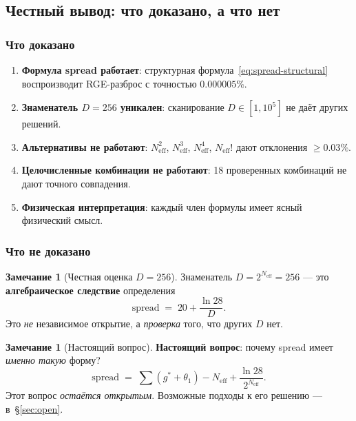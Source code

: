 \documentclass[11pt,a4paper]{article}
\theoremstyle{definition}
\newtheorem{remark}[theorem]{Замечание}
\begin{document}
\subsection{Честный вывод: что доказано, а что нет}
\label{subsec:spread-honest}

\subsubsection{Что доказано}

\begin{enumerate}
    \item \textbf{Формула spread работает}: структурная
          формула~\eqref{eq:spread-structural} воспроизводит
          RGE-разброс с точностью $\mathbf{0.000005\%}$.
    \item \textbf{Знаменатель $D = 256$ уникален}: сканирование
          $D \in [1, 10^5]$ не даёт других решений.
    \item \textbf{Альтернативы не работают}: $N_{\text{eff}}^2$,
          $N_{\text{eff}}^3$, $N_{\text{eff}}^4$, $N_{\text{eff}}!$
          дают отклонения $\geq 0.03\%$.
    \item \textbf{Целочисленные комбинации не работают}: 18 проверенных
          комбинаций не дают точного совпадения.
    \item \textbf{Физическая интерпретация}: каждый член
          формулы имеет ясный физический смысл.
\end{enumerate}

\subsubsection{Что не доказано}

\begin{remark}[Честная оценка $D = 256$]
\label{rem:honest-256}
Знаменатель $D = 2^{N_{\text{eff}}} = 256$ --- это
\textbf{алгебраическое следствие} определения
\begin{equation}
    \text{spread} \;=\; 20 + \frac{\ln 28}{D}.
\end{equation}
Это \emph{не} независимое открытие, а \emph{проверка} того,
что других $D$ нет.
\end{remark}

\begin{remark}[Настоящий вопрос]
\label{rem:real-question}
\textbf{Настоящий вопрос}: почему spread имеет \emph{именно
такую} форму?
\begin{equation}
    \text{spread} \;=\; \sum(g^* + \theta_1) - N_{\text{eff}}
    + \frac{\ln 28}{2^{N_{\text{eff}}}}.
\end{equation}
Этот вопрос \emph{остаётся открытым}. Возможные подходы
к его решению --- в~\S\ref{sec:open}.
\end{remark}
\end{document}
